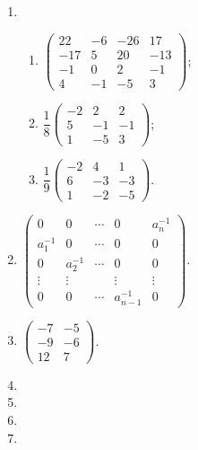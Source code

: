 \documentclass[a4paper, 11pt]{ctexart}
\begin{document}
\begin{enumerate}
    \item %
        \begin{enumerate}[(1)]
            \item %
                $
                    \left(
                        \begin{array}{cccc}
                            22 & -6 & -26 & 17 \\
                            -17 & 5 & 20 & -13 \\
                            -1 & 0 & 2 & -1 \\
                            4 & -1 & -5 & 3
                        \end{array}
                    \right)
                $;
            \item %
                $
                    \dfrac18
                    \left(
                        \begin{array}{ccc}
                            -2 & 2 & 2 \\
                            5 & -1 & -1 \\
                            1 & -5 & 3
                        \end{array}
                    \right)
                $;
            \item %
                $
                    \dfrac19
                    \left(
                        \begin{array}{ccc}
                            -2 & 4 & 1 \\
                            6 & -3 & -3 \\
                            1 & -2 & -5
                        \end{array}
                    \right)
                $.
        \end{enumerate}
    \item %
        $
            \left(
                \begin{array}{ccccc}
                    0 & 0 & \cdots & 0 & a_n^{-1} \\
                    a_1^{-1} & 0 & \cdots & 0 & 0 \\
                    0 & a_2^{-1} & \cdots & 0 & 0 \\
                    \vdots & \vdots &  & \vdots & \vdots \\
                    0 & 0 & \cdots & a_{n-1}^{-1} & 0
                \end{array}
            \right)
        $.
    \item %
        $
            \left(
                \begin{array}{cc}
                    -7 & -5 \\
                    -9 & -6 \\
                    12 & 7
                \end{array}
            \right)
        $.
    \item %
    \item %
    \item %
    \item %
\end{enumerate}
\end{document}
